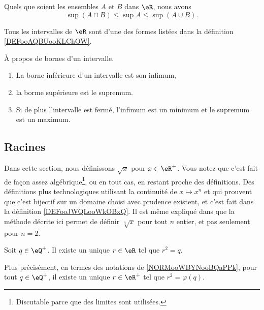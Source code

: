 \begin{proposition}     \label{PROPooANIOooIJHelX}
Quels que soient les ensembles $A$ et $B$ dans $\eR$, nous avons
\[
  \sup(A\cap B)\leq\sup A\leq\sup(A\cup B).
\]
\end{proposition}



\begin{proposition}     \label{PROPooHPMWooQJXCAS}
    Tous les intervalles de \( \eR\) sont d'une des formes listées dans la définition \ref{DEFooAQBUooKLChOW}.
\end{proposition}

\begin{lemma}       \label{LEMooWCUXooFqTwDK}
    À propos de bornes d'un intervalle.
    \begin{enumerate}
        \item
	        La borne inférieure d'un intervalle est son infimum, 
        \item
            la borme supérieure est le supremum. 
        \item
            Si de plus l'intervalle est fermé, l'infimum est un minimum et le supremum est un maximum.
    \end{enumerate}
\end{lemma}


\subsection{Racines}
\label{SUBSECooMBCNooEqjjTY}

Dans cette section, nous définissons \( \sqrt{ x }\) pour \( x\in\eR^+\). Vous notez que c'est fait de façon assez algébrique\footnote{Discutable parce que des limites sont utilisées.}, ou en tout cas, en restant proche des définitions. Des définitions plus technologiques utilisant la continuité de \( x\mapsto x^n\) et qui prouvent que c'est bijectif sur un domaine choisi avec prudence existent, et c'est fait dans la définition \ref{DEFooJWQLooWkOBxQ}. Il est même expliqué dans \cite{BIBooMPXEooQLKhku} que la méthode décrite ici permet de définir \( \sqrt[n]{ x }\) pour tout \( n\) entier, et pas seulement pour \( n=2\).

\begin{proposition}     \label{PROPooUHKFooVKmpte}
    Soit \( q\in \eQ^+\). Il existe un unique \( r\in \eR\) tel que \( r^2=q\).
    
    Plus précisément, en termes des notations de \ref{NORMooWBYNooBQaPPk}, pour tout \( q\in \eQ^+\), il existe un unique \( r\in \eR^+\) tel que \( r^2=\varphi(q)\).
\end{proposition}

